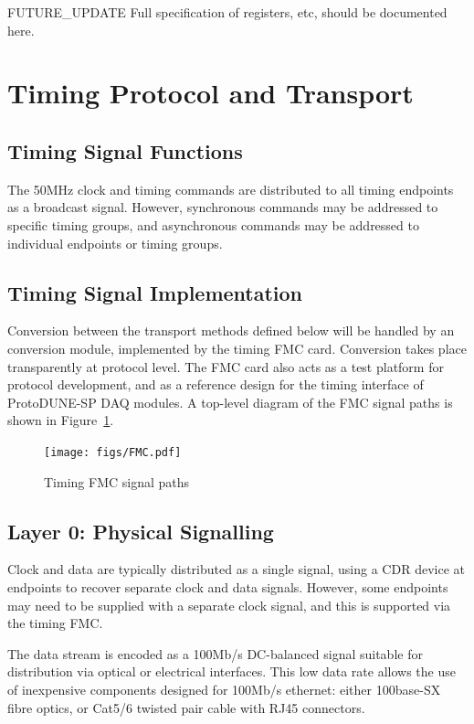 \documentclass[a4paper,11pt]{article}
\begin{document}
{\color{red}FUTURE\_UPDATE} Full specification of registers, etc, should be documented here.

\section{Timing Protocol and Transport}

\subsection{Timing Signal Functions}

The 50MHz clock and timing commands are distributed to all timing endpoints as a broadcast signal. However, synchronous commands may be addressed to specific timing groups, and asynchronous commands may be addressed to individual endpoints or timing groups.

\subsection{Timing Signal Implementation}

Conversion between the transport methods defined below will be handled by an conversion module, implemented by the timing FMC card. Conversion takes place transparently at protocol level. The FMC card also acts as a test platform for protocol development, and as a reference design for the timing interface of ProtoDUNE-SP DAQ modules. A top-level diagram of the FMC signal paths is shown in Figure~\ref{fig:FMC}.

\begin{figure}[p]
	\centering
	\texttt{[image: figs/FMC.pdf]}
	\caption{Timing FMC signal paths}
	\label{fig:FMC}
\end{figure}

\subsection{Layer 0: Physical Signalling}

Clock and data are typically distributed as a single signal, using a CDR device at endpoints to recover separate clock and data signals. However, some endpoints may need to be supplied with a separate clock signal, and this is supported via the timing FMC.

The data stream is encoded as a 100Mb/s DC-balanced signal suitable for distribution via optical or electrical interfaces. This low data rate allows the use of inexpensive components designed for 100Mb/s ethernet: either 100base-SX fibre optics, or Cat5/6 twisted pair cable with RJ45 connectors. 
\end{document}
